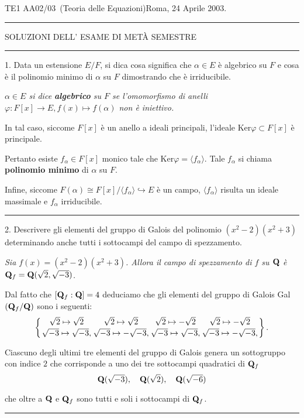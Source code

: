 \hsize=19.5cm
\vsize=27.58cm
\hoffset=-1.6cm
\voffset=0.5cm
\parskip=1mm
\noindent  TE1 AA02/03\ (Teoria delle
Equazioni)\hfill Roma, 24 Aprile 2003. \hrule
\medskip
\smallskip

\centerline{SOLUZIONI DELL' ESAME DI MET\`{A} SEMESTRE}\medskip

 \hfill \hrule
\medskip\medskip\medskip

\item{1.} Data un estensione $E/F$, si dica cosa significa che
$\alpha\in E$ \`{e} algebrico su $F$ e cosa \`{e} il polinomio
minimo di $\alpha$ su $F$ dimostrando che \`{e} irriducibile.
\medskip

{\it $\alpha\in E$ si dice {\bf algebrico} su $F$ se l'omomorfismo di anelli $\varphi: F[x]\rightarrow
 E, f(x) \mapsto f(\alpha)$ non \`{e} iniettivo.\smallskip

  In tal caso, siccome $F[x]$ \`{e} un anello
 a ideali principali, l'ideale Ker$\varphi\subset F[x]$ \`{e} principale.\smallskip

 Pertanto esiste $f_\alpha\in F[x]$
monico tale che Ker$\varphi = \langle f_\alpha \rangle$. Tale $f_\alpha$ si chiama {\bf polinomio minimo}
di $\alpha$ su $F$.\smallskip

 Infine, siccome $F(\alpha)\cong F[x]/\langle f_\alpha \rangle \hookrightarrow E$
\`{e} un campo, $\langle f_\alpha \rangle$ risulta un ideale
massimale e $f_\alpha$ irriducibile.}\medskip\hrule\medskip

 \item{2.} Descrivere gli elementi del gruppo di Galois del
polinomio $(x^2-2)(x^2+3)$ determinando anche tutti i sottocampi
del campo di spezzamento.
\medskip

{\it Sia $f(x)=(x^2-2)(x^2+3)$. Allora il campo di spezzamento di
$f$ su ${\bf Q}$ \`{e} ${\bf Q}_f={\bf Q}(\sqrt{2},
\sqrt{-3})$.\smallskip

Dal fatto che $[{\bf Q}_f:{\bf Q}]=4$ deduciamo che gli elementi del gruppo di Galois Gal$({\bf Q}_f/{\bf Q})$
sono i seguenti:
$$\left\{ {\sqrt{2}\mapsto \sqrt{2}\atop \sqrt{-3}\mapsto \sqrt{-3},}
{\sqrt{2}\mapsto \sqrt{2}\atop \sqrt{-3}\mapsto -\sqrt{-3},}
{\sqrt{2}\mapsto -\sqrt{2}\atop \sqrt{-3}\mapsto \sqrt{-3},}
{\sqrt{2}\mapsto -\sqrt{2}\atop \sqrt{-3}\mapsto -\sqrt{-3},}
\right\}.$$

Ciascuno degli ultimi tre elementi del gruppo di Galois genera un sottogruppo con indice $2$ che corrisponde
a uno dei tre sottocampi quadratici di ${\bf Q}_f$
$${\bf Q}(\sqrt{-3}),\quad {\bf Q}(\sqrt{2}),\quad {\bf Q}(\sqrt{-6})$$

che oltre a ${\bf Q}$ e ${\bf Q}_f$ sono tutti e soli i sottocampi
di ${\bf Q}_f$. }\medskip\hrule\medskip

